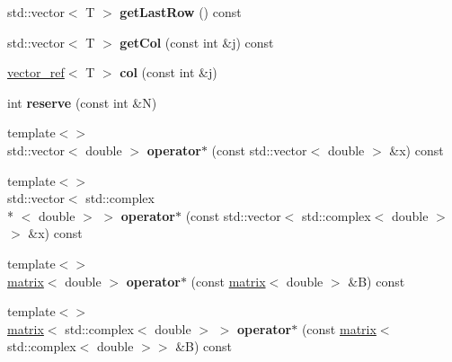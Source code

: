 \begin{DoxyCompactItemize}
\item 
\hypertarget{classkeycpp_1_1matrix_a20002e97217bcc6382e60694bf898e1f}{std\-::vector$<$ T $>$ {\bfseries get\-Last\-Row} () const }\label{classkeycpp_1_1matrix_a20002e97217bcc6382e60694bf898e1f}

\item 
\hypertarget{classkeycpp_1_1matrix_a9c16ead5c2a61eb35c33328caa235b2f}{std\-::vector$<$ T $>$ {\bfseries get\-Col} (const int \&j) const }\label{classkeycpp_1_1matrix_a9c16ead5c2a61eb35c33328caa235b2f}

\item 
\hypertarget{classkeycpp_1_1matrix_a09871aa61080cf8ff67ff792822797ac}{\hyperlink{classkeycpp_1_1vector__ref}{vector\-\_\-ref}$<$ T $>$ {\bfseries col} (const int \&j)}\label{classkeycpp_1_1matrix_a09871aa61080cf8ff67ff792822797ac}

\item 
\hypertarget{classkeycpp_1_1matrix_a719eb1cb62d0cd9168abe2235235f278}{int {\bfseries reserve} (const int \&N)}\label{classkeycpp_1_1matrix_a719eb1cb62d0cd9168abe2235235f278}

\item 
\hypertarget{classkeycpp_1_1matrix_a53aaf4f54bdbebf5664b67a440f73040}{{\footnotesize template$<$$>$ }\\std\-::vector$<$ double $>$ {\bfseries operator$\ast$} (const std\-::vector$<$ double $>$ \&x) const}\label{classkeycpp_1_1matrix_a53aaf4f54bdbebf5664b67a440f73040}

\item 
\hypertarget{classkeycpp_1_1matrix_a8a9131597beafc39a3d94b59af930756}{{\footnotesize template$<$$>$ }\\std\-::vector$<$ std\-::complex\\*
$<$ double $>$ $>$ {\bfseries operator$\ast$} (const std\-::vector$<$ std\-::complex$<$ double $>$$>$ \&x) const}\label{classkeycpp_1_1matrix_a8a9131597beafc39a3d94b59af930756}

\item 
\hypertarget{classkeycpp_1_1matrix_a0e9fdbebdf1d95dd225a2bd1310cba30}{{\footnotesize template$<$$>$ }\\\hyperlink{classkeycpp_1_1matrix}{matrix}$<$ double $>$ {\bfseries operator$\ast$} (const \hyperlink{classkeycpp_1_1matrix}{matrix}$<$ double $>$ \&B) const}\label{classkeycpp_1_1matrix_a0e9fdbebdf1d95dd225a2bd1310cba30}

\item 
\hypertarget{classkeycpp_1_1matrix_a0cbaef09170a16f74ed5acefa0f8ad3a}{{\footnotesize template$<$$>$ }\\\hyperlink{classkeycpp_1_1matrix}{matrix}$<$ std\-::complex$<$ double $>$ $>$ {\bfseries operator$\ast$} (const \hyperlink{classkeycpp_1_1matrix}{matrix}$<$ std\-::complex$<$ double $>$$>$ \&B) const}\label{classkeycpp_1_1matrix_a0cbaef09170a16f74ed5acefa0f8ad3a}

\end{DoxyCompactItemize}
